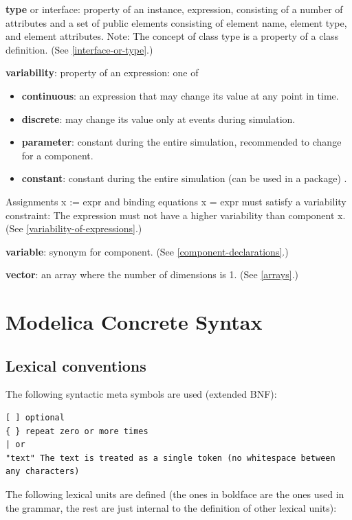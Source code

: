 \documentclass[10pt,a4paper]{report}
\def\doublelabel#1{\label{#1}}
\begin{document}
\textbf{type} or interface: property of an instance, expression, consisting of a number of attributes and a set of public
elements consisting of element name, element type, and element
attributes. Note: The concept of class type is a property of a class
definition. (See \ref{interface-or-type}.)

\textbf{variability}: property of an expression: one of
\begin{itemize}
\item \textbf{continuous}: an expression that may change its value at any
point in time.
\item \textbf{discrete}: may change its value only at events during
simulation.
\item \textbf{parameter}: constant during the entire simulation, recommended
to change for a component.
\item \textbf{constant}: constant during the entire simulation (can be used
in a package) .
\end{itemize}

Assignments x := expr and binding equations x = expr must satisfy a
variability constraint: The expression must not have a higher
variability than component x. (See \ref{variability-of-expressions}.)

\textbf{variable}: synonym for component. (See \ref{component-declarations}.)

\textbf{vector}: an array where the number of dimensions is 1. (See
\ref{arrays}.)

\chapter{Modelica Concrete Syntax}\doublelabel{modelica-concrete-syntax}
\section{Lexical conventions}\doublelabel{lexical-conventions}

The following syntactic meta symbols are used (extended BNF):
\begin{lstlisting}[language=grammar]
[ ] optional
{ } repeat zero or more times
| or
"text" The text is treated as a single token (no whitespace between any characters)
\end{lstlisting}

The following lexical units are defined (the ones in boldface are the
ones used in the grammar, the rest are just internal to the definition
of other lexical units):
\end{document}

